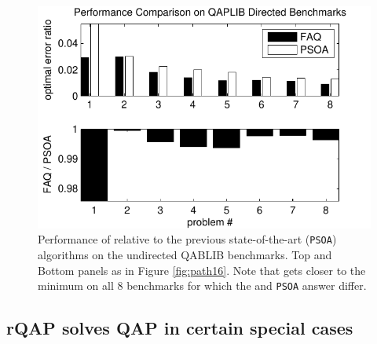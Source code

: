 \documentclass[10pt,journal,cspaper,compsoc]{IEEEtran}
\begin{document}
\begin{figure}[htbp]
	\centering
		\includegraphics[width=1.0\linewidth]{../figs/lipa16.pdf}
	\caption{Performance of \FAQ relative to the previous state-of-the-art (\texttt{PSOA}) algorithms on the undirected QABLIB benchmarks. Top and Bottom panels as in Figure \ref{fig:path16}.  Note that \FAQ gets closer to the minimum on all 8 benchmarks for which the \FAQ and \texttt{PSOA} answer differ.}
	\label{fig:lipa16}
\end{figure}



\subsection{rQAP solves QAP in certain special cases} %
\label{sub:rqap_solves_qap_}
\end{document}
